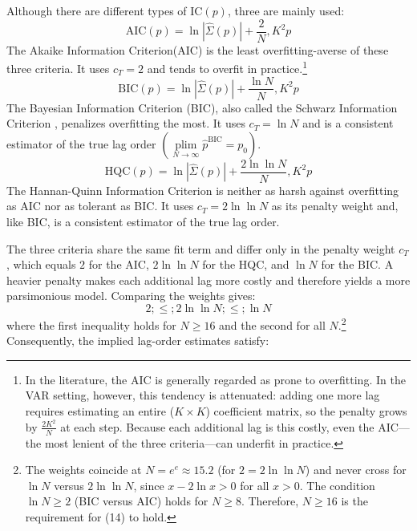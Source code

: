 \documentclass[12pt, a4paper]{article}
\begin{document}
Although there are different types of $\mathrm{IC}(p)$, three are mainly used:
\begin{equation} \label{eq:AIC}
\mathrm{AIC}(p) = \ln|\hat{\Sigma}(p)| + \frac{2}{N}, K^2 p
\end{equation}
The Akaike Information Criterion(AIC) \citep{akaikeNewLookStatistical1974} is the least overfitting-averse of these three criteria. It uses $c_T = 2$ and tends to overfit in practice.\footnote{In the literature, the AIC is generally regarded as prone to overfitting. In the VAR setting, however, this tendency is attenuated: adding one more lag requires estimating an entire ($K \times K$) coefficient matrix, so the penalty grows by $\frac {2K^{2}}{N}$ at each step. Because each additional lag is this costly, even the AIC—the most lenient of the three criteria—can underfit in practice.}
\begin{equation} \label{eq:BIC}
\mathrm{BIC}(p) = \ln|\hat{\Sigma}(p)| + \frac{\ln N}{N}, K^2 p
\end{equation}
The Bayesian Information Criterion (BIC), also called the Schwarz Information Criterion \citep{schwarzEstimatingDimensionModel1978}, penalizes overfitting the most. It uses $c_T = \ln {N}$ and is a consistent estimator of the true lag order $\left( \operatorname*{plim}\limits_{N \to \infty} \hat{p}^{\mathrm{BIC}} = p_0 \right)$.
\begin{equation} \label{eq:HQC}
\mathrm{HQC}(p) = \ln|\hat{\Sigma}(p)| + \frac{2\ln\ln N}{N}, K^2 p
\end{equation}
The Hannan-Quinn Information Criterion \citep{hannanDeterminationOrderAutoregression1979} is neither as harsh against overfitting as AIC nor as tolerant as BIC. It uses $c_T = 2 \ln {\ln N}$ as its penalty weight and, like BIC, is a consistent estimator of the true lag order.

The three criteria share the same fit term and differ only in the penalty weight $c_T$, which equals $2$ for the AIC, $2 \ln \ln N$ for the HQC, and $\ln N$ for the BIC. A heavier penalty makes each additional lag more costly and therefore yields a more parsimonious model. Comparing the weights gives:
\begin{equation} \label{eq:IC_comp}
2 ;\leq; 2\ln\ln N ;\leq; \ln N
\end{equation}
where the first inequality holds for $N \ge 16$ and the second for all $N$.\footnote{The weights coincide at $N = e^{e} \approx 15.2$ (for $2 = 2\ln{\ln N}$) and never cross for $\ln N$ versus $2 \ln \ln N$, since $x - 2 \ln x > 0$ for all $x > 0$. The condition $\ln N \ge 2$ (BIC versus AIC) holds for $N \ge 8$. Therefore, $N \ge 16$ is the requirement for (14) to hold.} Consequently, the implied lag-order estimates satisfy:
\end{document}
